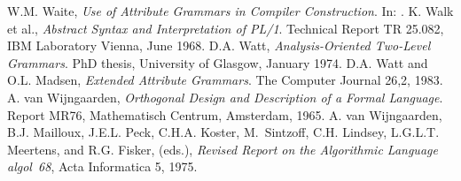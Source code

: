 \begin{thebibliography}{10}
W.M. Waite,
{\em Use of Attribute Grammars in Compiler Construction}.
In: \cite{waga}.
\vspace{-2mm}
K. Walk et al.,
{\em Abstract Syntax and Interpretation of PL/1}.
Technical Report TR 25.082, IBM Laboratory Vienna, June 1968.
\vspace{-2mm}
D.A. Watt,
{\em Analysis-Oriented Two-Level Grammars}.
PhD thesis, University of Glasgow, January 1974.
\vspace{-2mm}
D.A. Watt and O.L. Madsen,
{\em Extended Attribute Grammars}.
The Computer Journal 26,2, 1983.
\vspace{-2mm}
A. van Wijngaarden,
{\em Orthogonal Design and Description of a Formal Language}.
Report MR76, Mathematisch Centrum, Amsterdam, 1965.
\vspace{-2mm}
{A. van} Wijngaarden, B.J. Mailloux, J.E.L. Peck, C.H.A. Koster, M.~Sintzoff,
  C.H. Lindsey, L.G.L.T. Meertens, and R.G. Fisker, (eds.),
{\em Revised Report on the Algorithmic Language {{\sc algol~68}}},
Acta Informatica 5, 1975.
\end{thebibliography}


